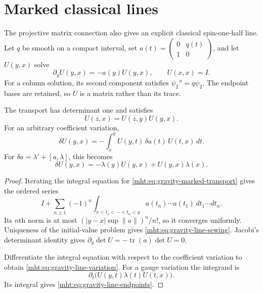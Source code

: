 \section{Marked classical lines}

The projective matrix connection also gives an explicit classical
spin-one-half line. Let $q$ be smooth on a compact interval, set
$a(t)=\left(\begin{smallmatrix}0&q(t)\\1&0\end{smallmatrix}\right)$,
and let $U(y,x)$ solve
\begin{equation}\label{mht:eq:gravity-marked-transport}
 \partial_yU(y,x)=-a(y)U(y,x),\qquad U(x,x)=I.
\end{equation}
For a column solution, its second component satisfies
$\psi_2''=q\psi_2$.
The endpoint bases are retained, so $U$ is a matrix rather than
its trace.

\begin{proposition}\label{mht:prop:gravity-marked-lines}
The transport has determinant one and satisfies
\begin{equation}\label{mht:eq:gravity-line-sewing}
 U(z,x)=U(z,y)U(y,x).
\end{equation}
For an arbitrary coefficient variation,
\begin{equation}\label{mht:eq:gravity-line-variation}
 \delta U(y,x)
 =-\int_x^yU(y,t)\,\delta a(t)\,U(t,x)\,dt.
\end{equation}
For $\delta a=\lambda'+[a,\lambda]$, this becomes
\begin{equation}\label{mht:eq:gravity-line-endpoints}
 \delta U(y,x)=-\lambda(y)U(y,x)+U(y,x)\lambda(x).
\end{equation}
\end{proposition}

\begin{proof}
Iterating the integral equation for
\eqref{mht:eq:gravity-marked-transport} gives the ordered series
\[
 I+\sum_{n\ge1}(-1)^n
 \int_{x<t_1<\cdots<t_n<y}
       a(t_n)\cdots a(t_1)\,dt_1\cdots dt_n.
\]
Its $n$th norm is at most
$(|y-x|\sup\|a\|)^n/n!$, so it converges uniformly.
Uniqueness of the initial-value problem gives
\eqref{mht:eq:gravity-line-sewing}.
Jacobi's determinant identity gives
$\partial_y\det U=-\operatorname{tr}(a)\det U=0$.

Differentiate the integral equation with respect to the
coefficient variation to obtain \eqref{mht:eq:gravity-line-variation}.
For a gauge variation the integrand is
\[
 \partial_t\bigl(U(y,t)\lambda(t)U(t,x)\bigr).
\]
Its integral gives \eqref{mht:eq:gravity-line-endpoints}.
\end{proof}

